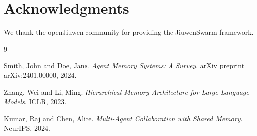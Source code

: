 \documentclass{article}
\begin{document}
\section*{Acknowledgments}

We thank the openJiuwen community for providing the JiuwenSwarm framework.

\begin{thebibliography}{9}

Smith, John and Doe, Jane.
\textit{Agent Memory Systems: A Survey}.
arXiv preprint arXiv:2401.00000, 2024.

Zhang, Wei and Li, Ming.
\textit{Hierarchical Memory Architecture for Large Language Models}.
ICLR, 2023.

Kumar, Raj and Chen, Alice.
\textit{Multi-Agent Collaboration with Shared Memory}.
NeurIPS, 2024.

\end{thebibliography}
\end{document}
